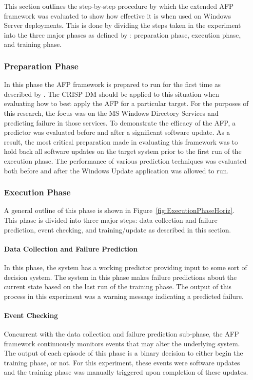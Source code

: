 This section outlines the step-by-step procedure by which the extended \ac{AFP}
framework was evaluated to show how effective it is when used on Windows Server
deployments.  This is done by dividing the steps taken in the experiment into
the three major phases as defined by \citet{irrera2015}: preparation phase,
execution phase, and training phase.

\subsubsection{Preparation Phase}
In this phase the \ac{AFP} framework is prepared to run for the first time as
described by \citet{irrera2015}.  The \ac{CRISP-DM} \citep{crispdm} should be
applied to this situation when evaluating how to best apply the \ac{AFP} for a
particular target.  For the purposes of this research, the focus was on the
\ac{MS} Windows Directory Services and predicting failure in those services.
To demonstrate the efficacy of the \ac{AFP}, a predictor was evaluated before
and after a significant software update.  As a result, the most critical
preparation made in evaluating this framework was to hold back all software
updates on the target system prior to the first run of the execution phase.
The performance of various prediction techniques was evaluated both before and
after the Windows Update application was allowed to run.

\subsubsection{Execution Phase}
A general outline of this phase is shown in
Figure~\ref{fig:ExecutionPhaseHoriz}.  This phase is divided into three major
steps: data collection and failure prediction, event checking, and
training/update as described in this section.


\paragraph{Data Collection and Failure Prediction}
In this phase, the system has a working predictor providing input to some sort
of decision system.  The system in this phase makes failure predictions about
the current state based on the last run of the training phase.  The output of
this process in this experiment was a warning message indicating a predicted
failure.

\paragraph{Event Checking}
Concurrent with the data collection and failure prediction sub-phase, the
\ac{AFP} framework continuously monitors events that may alter the underlying
system.  The output of each episode of this phase is a binary decision to
either begin the training phase, or not.  For this experiment, these events
were software updates and the training phase was manually triggered upon
completion of these updates.

